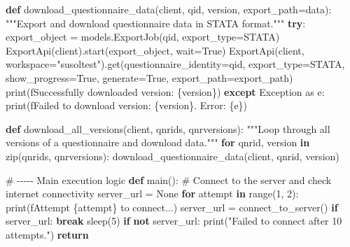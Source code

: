 \documentclass[
  letterpaper,
  DIV=11,
  numbers=noendperiod]{scrreprt}
\newenvironment{Shaded}{\begin{snugshade}}{\end{snugshade}}
\newcommand{\BuiltInTok}[1]{\textcolor[rgb]{0.00,0.23,0.31}{#1}}
\newcommand{\CommentTok}[1]{\textcolor[rgb]{0.37,0.37,0.37}{#1}}
\newcommand{\ControlFlowTok}[1]{\textcolor[rgb]{0.00,0.23,0.31}{\textbf{#1}}}
\newcommand{\DecValTok}[1]{\textcolor[rgb]{0.68,0.00,0.00}{#1}}
\newcommand{\ImportTok}[1]{\textcolor[rgb]{0.00,0.46,0.62}{#1}}
\newcommand{\KeywordTok}[1]{\textcolor[rgb]{0.00,0.23,0.31}{\textbf{#1}}}
\newcommand{\NormalTok}[1]{\textcolor[rgb]{0.00,0.23,0.31}{#1}}
\newcommand{\OperatorTok}[1]{\textcolor[rgb]{0.37,0.37,0.37}{#1}}
\newcommand{\PreprocessorTok}[1]{\textcolor[rgb]{0.68,0.00,0.00}{#1}}
\newcommand{\SpecialCharTok}[1]{\textcolor[rgb]{0.37,0.37,0.37}{#1}}
\newcommand{\SpecialStringTok}[1]{\textcolor[rgb]{0.13,0.47,0.30}{#1}}
\newcommand{\StringTok}[1]{\textcolor[rgb]{0.13,0.47,0.30}{#1}}
\newcommand{\VariableTok}[1]{\textcolor[rgb]{0.07,0.07,0.07}{#1}}
\begin{document}
\begin{Shaded}
\begin{Highlighting}[]
\KeywordTok{def}\NormalTok{ download\_questionnaire\_data(client, qid, version, export\_path}\OperatorTok{=}\StringTok{\textquotesingle{}data\textquotesingle{}}\NormalTok{):}
    \CommentTok{"""Export and download questionnaire data in STATA format."""}
    \ControlFlowTok{try}\NormalTok{:}
\NormalTok{        export\_object }\OperatorTok{=}\NormalTok{ models.ExportJob(qid, export\_type}\OperatorTok{=}\StringTok{\textquotesingle{}STATA\textquotesingle{}}\NormalTok{)}
\NormalTok{        ExportApi(client).start(export\_object, wait}\OperatorTok{=}\VariableTok{True}\NormalTok{)}
\NormalTok{        ExportApi(client, workspace}\OperatorTok{=}\StringTok{"susoltest"}\NormalTok{).get(questionnaire\_identity}\OperatorTok{=}\NormalTok{qid, export\_type}\OperatorTok{=}\StringTok{\textquotesingle{}STATA\textquotesingle{}}\NormalTok{, show\_progress}\OperatorTok{=}\VariableTok{True}\NormalTok{, generate}\OperatorTok{=}\VariableTok{True}\NormalTok{, export\_path}\OperatorTok{=}\NormalTok{export\_path)}
        \BuiltInTok{print}\NormalTok{(}\SpecialStringTok{f\textquotesingle{}Successfully downloaded version: }\SpecialCharTok{\{}\NormalTok{version}\SpecialCharTok{\}}\SpecialStringTok{\textquotesingle{}}\NormalTok{)}
    \ControlFlowTok{except} \PreprocessorTok{Exception} \ImportTok{as}\NormalTok{ e:}
        \BuiltInTok{print}\NormalTok{(}\SpecialStringTok{f\textquotesingle{}Failed to download version: }\SpecialCharTok{\{}\NormalTok{version}\SpecialCharTok{\}}\SpecialStringTok{. Error: }\SpecialCharTok{\{}\NormalTok{e}\SpecialCharTok{\}}\SpecialStringTok{\textquotesingle{}}\NormalTok{)}


\KeywordTok{def}\NormalTok{ download\_all\_versions(client, qnrids, qnrversions):}
    \CommentTok{"""Loop through all versions of a questionnaire and download data."""}
    \ControlFlowTok{for}\NormalTok{ qnrid, version }\KeywordTok{in} \BuiltInTok{zip}\NormalTok{(qnrids, qnrversions):}
\NormalTok{        download\_questionnaire\_data(client, qnrid, version)}


\CommentTok{\# {-}{-}{-}{-}{-} Main execution logic}
\KeywordTok{def}\NormalTok{ main():}
    \CommentTok{\# Connect to the server and check internet connectivity}
\NormalTok{    server\_url }\OperatorTok{=} \VariableTok{None}
    \ControlFlowTok{for}\NormalTok{ attempt }\KeywordTok{in} \BuiltInTok{range}\NormalTok{(}\DecValTok{1}\NormalTok{, }\DecValTok{2}\NormalTok{):}
        \BuiltInTok{print}\NormalTok{(}\SpecialStringTok{f\textquotesingle{}Attempt }\SpecialCharTok{\{}\NormalTok{attempt}\SpecialCharTok{\}}\SpecialStringTok{ to connect...\textquotesingle{}}\NormalTok{)}
\NormalTok{        server\_url }\OperatorTok{=}\NormalTok{ connect\_to\_server()}
        \ControlFlowTok{if}\NormalTok{ server\_url:}
            \ControlFlowTok{break}
\NormalTok{        sleep(}\DecValTok{5}\NormalTok{)}
    \ControlFlowTok{if} \KeywordTok{not}\NormalTok{ server\_url:}
        \BuiltInTok{print}\NormalTok{(}\StringTok{"Failed to connect after 10 attempts."}\NormalTok{)}
        \ControlFlowTok{return}


\end{Highlighting}
\end{Shaded}
\end{document}

